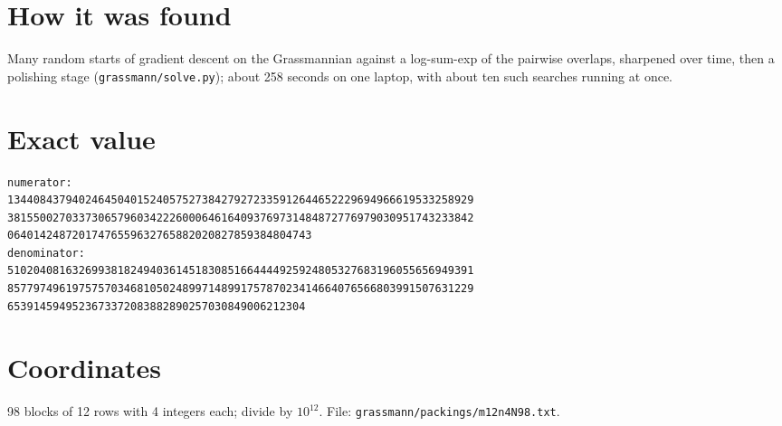\documentclass[11pt,a4paper]{article}
\begin{document}
\section{How it was found}
Many random starts of gradient descent on the Grassmannian against a log-sum-exp of the pairwise overlaps, sharpened over time, then a polishing stage (\texttt{grassmann/solve.py}); about 258 seconds on one laptop, with about ten such searches running at once.


\appendix
\section{Exact value}
{\small
\begin{verbatim}
numerator:
134408437940246450401524057527384279272335912644652229694966619533258929
381550027033730657960342226000646164093769731484872776979030951743233842
06401424872017476559632765882020827859384804743
denominator:
510204081632699381824940361451830851664444925924805327683196055656949391
857797496197575703468105024899714899175787023414664076566803991507631229
6539145949523673372083882890257030849006212304
\end{verbatim}}

\section{Coordinates}
98 blocks of 12 rows with 4 integers each; divide by $10^{12}$. File: \texttt{grassmann/packings/m12n4N98.txt}.
{\tiny
\begin{multicols}{3}
\end{multicols}}
\end{document}
